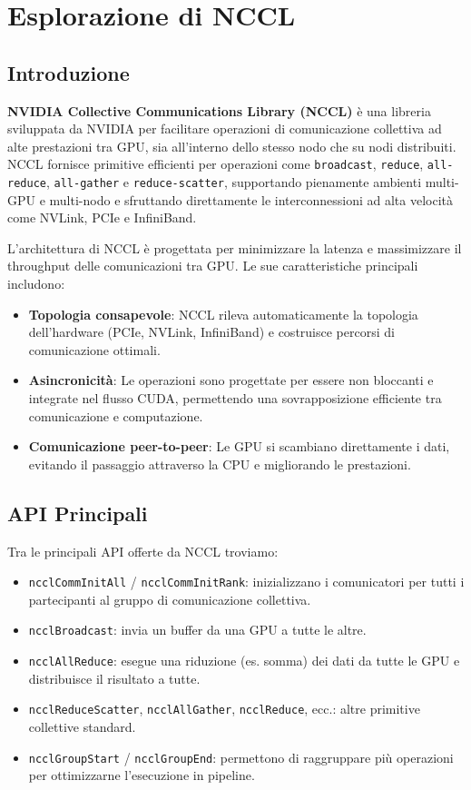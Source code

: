 \section{Esplorazione di NCCL}

\subsection{Introduzione}

\textbf{NVIDIA Collective Communications Library (NCCL)} è una libreria sviluppata da NVIDIA per facilitare operazioni di comunicazione collettiva ad alte prestazioni tra GPU, sia all'interno dello stesso nodo che su nodi distribuiti. NCCL fornisce primitive efficienti per operazioni come \texttt{broadcast}, \texttt{reduce}, \texttt{all-reduce}, \texttt{all-gather} e \texttt{reduce-scatter}, supportando pienamente ambienti multi-GPU e multi-nodo e sfruttando direttamente le interconnessioni ad alta velocità come NVLink, PCIe e InfiniBand.

L'architettura di NCCL è progettata per minimizzare la latenza e massimizzare il throughput delle comunicazioni tra GPU. Le sue caratteristiche principali includono:

\begin{itemize}
    \item \textbf{Topologia consapevole}: NCCL rileva automaticamente la topologia dell’hardware (PCIe, NVLink, InfiniBand) e costruisce percorsi di comunicazione ottimali.
    \item \textbf{Asincronicità}: Le operazioni sono progettate per essere non bloccanti e integrate nel flusso CUDA, permettendo una sovrapposizione efficiente tra comunicazione e computazione.
    \item \textbf{Comunicazione peer-to-peer}: Le GPU si scambiano direttamente i dati, evitando il passaggio attraverso la CPU e migliorando le prestazioni.
\end{itemize}

\subsection{API Principali}
Tra le principali API offerte da NCCL troviamo:
\begin{itemize}
    \item \texttt{ncclCommInitAll} / \texttt{ncclCommInitRank}: inizializzano i comunicatori per tutti i partecipanti al gruppo di comunicazione collettiva.
    \item \texttt{ncclBroadcast}: invia un buffer da una GPU a tutte le altre.
    \item \texttt{ncclAllReduce}: esegue una riduzione (es. somma) dei dati da tutte le GPU e distribuisce il risultato a tutte.
    \item \texttt{ncclReduceScatter}, \texttt{ncclAllGather}, \texttt{ncclReduce}, ecc.: altre primitive collettive standard.
    \item \texttt{ncclGroupStart} / \texttt{ncclGroupEnd}: permettono di raggruppare più operazioni per ottimizzarne l’esecuzione in pipeline.
\end{itemize}

